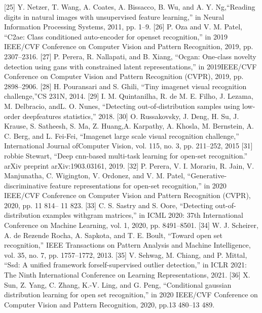 \documentclass{gji}
\begin{document}
\begin{thebibliography}{}
 [25] Y. Netzer, T. Wang, A. Coates, A. Bissacco, B. Wu, and A. Y. Ng,“Reading digits in natural images with unsupervised feature learning,” in Neural Information Processing Systems, 2011, pp. 1–9.
 [26] P. Oza and V. M. Patel, “C2ae: Class conditioned auto-encoder for openset recognition,” in 2019 IEEE/CVF Conference on Computer Vision and Pattern Recognition, 2019, pp. 2307–2316.
 [27] P. Perera, R. Nallapati, and B. Xiang, “Ocgan: One-class novelty detection using gans with constrained latent representations,” in 2019IEEE/CVF Conference on Computer Vision and Pattern Recognition (CVPR), 2019, pp. 2898–2906.
 [28] H. Pouransari and S. Ghili, “Tiny imagenet visual recognition challenge,”CS 231N, 2014.
 [29] I. M. Quintanilha, R. de M. E. Filho, J. Lezama, M. Delbracio, andL. O. Nunes, “Detecting out-of-distribution samples using low-order deepfeatures statistics,” 2018.
 [30] O. Russakovsky, J. Deng, H. Su, J. Krause, S. Satheesh, S. Ma, Z. Huang,A. Karpathy, A. Khosla, M. Bernstein, A. C. Berg, and L. Fei-Fei, “Imagenet large scale visual recognition challenge,” International Journal ofComputer Vision, vol. 115, no. 3, pp. 211–252, 2015 
 [31] robbie Stewart, “Deep cnn-based multi-task learning for open-set recognition.” arXiv preprint arXiv:1903.03161, 2019.
 [32] P. Perera, V. I. Morariu, R. Jain, V. Manjunatha, C. Wigington, V. Ordonez, and V. M. Patel, “Generative-discriminative feature representations for open-set recognition,” in 2020 IEEE/CVF Conference on Computer Vision and Pattern Recognition (CVPR), 2020, pp. 11 814– 11 823.
 [33] C. S. Sastry and S. Oore, “Detecting out-of-distribution examples withgram matrices,” in ICML 2020: 37th International Conference on Machine Learning, vol. 1, 2020, pp. 8491–8501.
 [34] W. J. Scheirer, A. de Rezende Rocha, A. Sapkota, and T. E. Boult, “Toward open set recognition,” IEEE Transactions on Pattern Analysis and Machine Intelligence, vol. 35, no. 7, pp. 1757–1772, 2013.
 [35] V. Sehwag, M. Chiang, and P. Mittal, “Ssd: A unified framework forself-supervised outlier detection,” in ICLR 2021: The Ninth International Conference on Learning Representations, 2021.
 [36] X. Sun, Z. Yang, C. Zhang, K.-V. Ling, and G. Peng, “Conditional gaussian distribution learning for open set recognition,” in 2020 IEEE/CVF Conference on Computer Vision and Pattern Recognition, 2020, pp.13 480–13 489.

\end{thebibliography}
\end{document}
